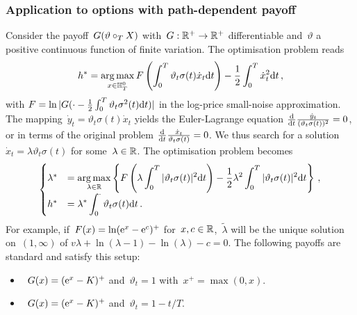 \subsubsection{\textbf{Application to options with path-dependent payoff}}
\label{ex:BSPathDep}
Consider the payoff~$G(\vartheta\circ_{T}\nobreak X)$ with~$G:\mathbb{R}^+ \to \mathbb{R}^+$ differentiable and~$\vartheta$ 
a positive continuous function of finite variation. 
The optimisation problem reads
$$
h^{*} = \operatorname*{arg\,max}\limits_{x \in \mathbb{H}_T^0} F\left(\int_0^T \vartheta_t \sigma(t) \dot{x}_t \mathrm{d} t\right) - \frac{1}{2}\int_0^T \dot{x}_t^2 \mathrm{d} t\,,
$$
with %
$F = \ln|G(\cdot - \frac{1}{2}\int_0^T\vartheta_t \sigma^2(t) \mathrm{d} t)|$ in the log-price small-noise approximation. 
The mapping~$\dot{y}_t = \vartheta_t\sigma(t)\dot{x}_t$
yields the Euler-Lagrange equation
$
\frac{\mathrm{d}}{\mathrm{d} t}\frac{\dot{y}_t}{(\vartheta_t\sigma(t))^2} = 0$,
or in terms of the original problem
$\frac{\mathrm{d}}{\mathrm{d} t}\frac{\dot{x}_t}{\vartheta_t\sigma(t)} = 0$.
We thus search for a solution~$\dot{x}_t = \lambda \vartheta_t\sigma(t)$ for some~$\lambda \in\mathbb{R}$. 
The optimisation problem becomes
\[
\begin{cases}
\lambda^{*} &= \displaystyle \operatorname*{arg\,max}\limits_{\lambda \in\mathbb{R}}
\left\{F\left(\lambda \int_0^T |\vartheta_t \sigma(t)|^2 \mathrm{d} t\right)  - \frac{1}{2}\lambda^2 \int_0^T |\vartheta_t \sigma(t)|^2 \mathrm{d} t\right\}\,, \\
h^{*} &= \displaystyle \lambda^{*} \int_0^\cdot \vartheta_t \sigma(t) \mathrm{d} t\,.
\end{cases}
\]
For example, if~$F(x) = \ln(\mathrm{e}^x - \mathrm{e}^c)^+$ for~$x,c \in\mathbb{R}$,~$\widetilde{\lambda}$ will be the unique solution on~$(1,\infty)$ of
$v\lambda + \ln(\lambda - 1) - \ln(\lambda) - c = 0$.
The following payoffs are standard
and satisfy this setup:
\begin{itemize}
\item {}~$G(x) = (\mathrm{e}^{x} - K)^+$ and~$\vartheta_t=1$ with~$x^+ = \max(0,x)$. 
\item {}~$G(x) = (\mathrm{e}^{x} - K)^+$ and~$\vartheta_t=1 - t/T$. 
\end{itemize}

